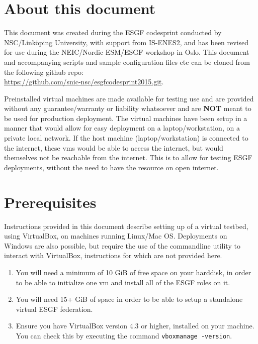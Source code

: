 \section {About this document}
This document was created during the ESGF codesprint conducted by NSC/Link\"oping University, with support from IS-ENES2, and has been revised for use during the NEIC/Nordic ESM/ESGF workshop in Oslo. 
This document and accompanying scripts and sample configuration files etc can be cloned from the following github repo:\\
\url{https://github.com/snic-nsc/esgfcodesprint2015.git}.
\par\vspace{2mm}\noindent
Preinstalled virtual machines are made available for testing use and are provided without any guarantee/warranty or liability whatsoever and are \textbf{NOT} meant to be used for production deployment.  The virtual machines have been setup in a manner that would allow for easy deployment on a laptop/workstation, on a private local network. If the host machine (laptop/workstation) is connected to the internet, these vms would be able to access the internet, but would themselves not be reachable from the internet. This is to allow for testing ESGF deployments, without the need to have the resource on open internet.
\section{Prerequisites}
Instructions provided in this document describe setting up of a virtual testbed, using VirtualBox, on machines running Linux/Mac OS. Deployments on Windows are also possible, but require the use of the commandline utility to interact with VirtualBox, instructions for which are not provided here.
\begin{enumerate}
\item You will need a minimum of 10 GiB of free space on your harddisk, in order to be able to initialize one vm and install all of the ESGF roles on it.
\item You will need 15+ GiB of space in order to be able to setup a standalone virtual ESGF federation.
\item Ensure you have VirtualBox version 4.3 or higher, installed on your machine. You can check this by executing the command \texttt{vboxmanage -version}.
\end{enumerate}
